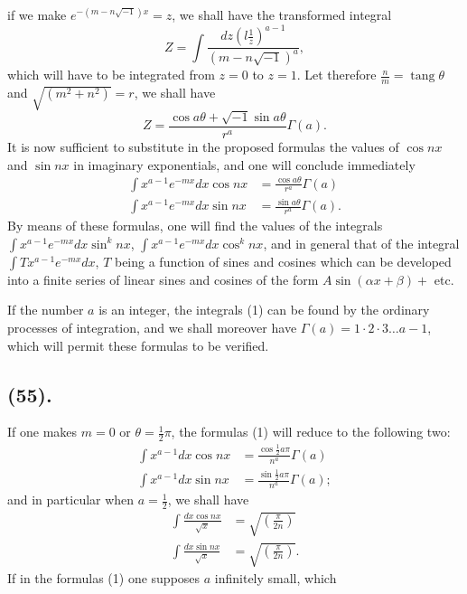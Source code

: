\documentclass{article}
\begin{document}
if we make $e^{-(m-n\sqrt{-1})x}=z$, we shall have the transformed integral
\[ Z=\int\frac{dz\left(l\frac{1}{z}\right)^{a-1}}{(m-n\sqrt{-1})^{a}}, \]
which will have to be integrated from $z=0$ to $z=1$. Let therefore $\frac{n}{m}=\operatorname{tang}\theta$ and $\sqrt{(m^{2}+n^{2})}=r$, we shall have
\[ Z=\frac{\cos a\theta+\sqrt{-1}\sin a\theta}{r^{a}}\Gamma(a). \]
It is now sufficient to substitute in the proposed formulas the values of $\cos nx$ and $\sin nx$ in imaginary exponentials, and one will conclude immediately
\[ \begin{aligned} \int x^{a-1}e^{-mx}dx\cos nx&=\frac{\cos a\theta}{r^{a}}\Gamma(a)\\ \int x^{a-1}e^{-mx}dx\sin nx&=\frac{\sin a\theta}{r^{a}}\Gamma(a). \end{aligned} \tag{1} \]
By means of these formulas, one will find the values of the integrals $\displaystyle\int x^{a-1}e^{-mx}dx\sin^{k}nx$, $\displaystyle\int x^{a-1}e^{-mx}dx\cos^{k}nx$, and in general that of the integral $\displaystyle\int Tx^{a-1}e^{-mx}dx$, $T$ being a function of sines and cosines which can be developed into a finite series of linear sines and cosines of the form $A\sin(\alpha x+\beta)+$ etc.

If the number $a$ is an integer, the integrals (1) can be found by the ordinary processes of integration, and we shall moreover have $\Gamma(a)=1\cdot2\cdot3\ldots a-1$, which will permit these formulas to be verified.

\subsection*{(55).}

If one makes $m=0$ or $\theta=\frac{1}{2}\pi$, the formulas (1) will reduce to the following two:
\[ \begin{aligned} \int x^{a-1}dx\cos nx&=\frac{\cos\frac{1}{2}a\pi}{n^{a}}\Gamma(a)\\ \int x^{a-1}dx\sin nx&=\frac{\sin\frac{1}{2}a\pi}{n^{a}}\Gamma(a); \end{aligned} \tag{2} \]
and in particular when $a=\frac{1}{2}$, we shall have
\[ \begin{aligned} \int\frac{dx\cos nx}{\sqrt{x}}&=\sqrt{\left(\frac{\pi}{2n}\right)}\\ \int\frac{dx\sin nx}{\sqrt{x}}&=\sqrt{\left(\frac{\pi}{2n}\right)}. \end{aligned} \tag{3} \]
If in the formulas (1) one supposes $a$ infinitely small, which
\end{document}
